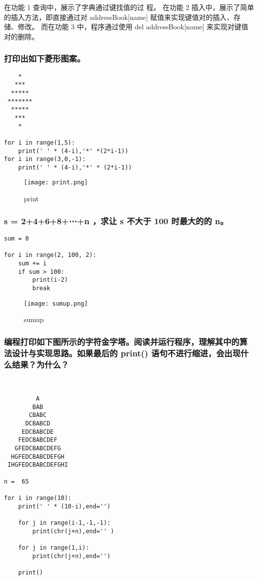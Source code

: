 \documentclass{ctexart}
\begin{document}
在功能 1 查询中，展示了字典通过键找值的过
程。
在功能 2 插入中，展示了简单的插入方法，即直接通过对
addressBook[name] 赋值来实现键值对的插入、存储、修改。
而在功能 3 中，程序通过使用
del addressBook[name] 来实现对键值对的删除。
 

\subsubsection{打印出如下菱形图案。}

\begin{lstlisting}
    * 
   *** 
  ***** 
 ******* 
  ***** 
   *** 
    *
    
for i in range(1,5):
    print(' ' * (4-i),'*' *(2*i-1))
for i in range(3,0,-1):
    print(' ' * (4-i),'*' * (2*i-1))
\end{lstlisting}

\begin{figure}[H]
    \centering
    \texttt{[image: print.png]}
    \caption{print}
    \label{fig:enter-label}
\end{figure}


\subsubsection{s = 2+4+6+8+⋯+n ，求让 s 不大于 100 时最大的的 n。}

\begin{lstlisting}
sum = 0

for i in range(2, 100, 2):
    sum += i
    if sum > 100:
        print(i-2)
        break
\end{lstlisting}

\begin{figure}[H]
    \centering
    \texttt{[image: sumup.png]}
    \caption{sumup}
    \label{fig:enter-label}
\end{figure}

\subsubsection{编程打印如下图所示的字符金字塔。阅读并运行程序，理解其中的算法设计与实现思路。如果最后的 print() 语句不进行缩进，会出现什么结果？为什么？}
\begin{lstlisting}


         A
        BAB
       CBABC
      DCBABCD
     EDCBABCDE
    FEDCBABCDEF
   GFEDCBABCDEFG
  HGFEDCBABCDEFGH
 IHGFEDCBABCDEFGHI

n =  65

for i in range(10):
    print(' ' * (10-i),end='')

    for j in range(i-1,-1,-1):
        print(chr(j+n),end='' )

    for j in range(1,i):
        print(chr(j+n),end='')

    print()
\end{lstlisting}
\end{document}
